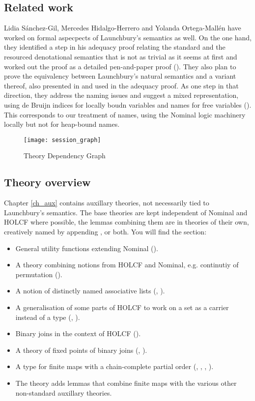 \documentclass[11pt,a4paper,parskip=half]{scrartcl}
\begin{document}
\subsection{Related work}

Lidia Sánchez-Gil, Mercedes Hidalgo-Herrero and Yolanda Ortega-Mallén have worked on formal aspecpects of Launchbury’s semantics as well. On the one hand, they identified a step in his adequacy proof relating the standard and the resourced denotational semantics that is not as trivial as it seems at first and worked out the proof as a detailed pen-and-paper proof (\cite{functionspaces}). They also plan to prove the equivalency between Launchbury’s natural semantics and a variant thereof, also presented in \cite{launchbury} and used in the adequacy proof. As one step in that direction, they address the naming issues and suggest a mixed representation, using de Bruijn indices for locally boudn variables and names for free variables (\cite{nameless}). This corresponds to our treatment of names, using the Nominal logic machinery locally but not for heap-bound names. 


\begin{figure}
\begin{center}
  \texttt{[image: session\_graph]}
\end{center}
\caption{Theory Dependency Graph\label{theory-deps}}
\end{figure}

\subsection{Theory overview}

Chapter \ref{ch_aux} contains auxillary theories, not necessarily tied to Launchbury's semantics. The base theories are kept independent of Nominal and HOLCF where possible, the lemmas combining them are in theories of their own, creatively named by appending ,  or both.  You will find the section:
\begin{itemize}
\item General utility functions extending Nominal ().
\item A theory combining notions from HOLCF and Nominal, e.g. continutiy of permutation ().
\item A notion of distinctly named associative lists (, ). 
\item A generalisation of some parts of HOLCF to work on a set as a carrier instead of a type (, ).
\item Binary joins in the context of HOLCF ().
\item A theory of fixed points of binary joins (, ).
\item A type for finite maps with a chain-complete partial order (, , , ).
\item The theory  adds lemmas that combine finite maps with the various other non-standard auxillary theories.
\end{itemize}
\end{document}
